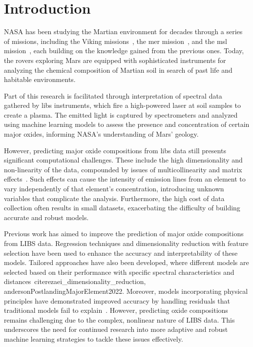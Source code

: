 \section{Introduction}\label{sec:introduction}
NASA has been studying the Martian environment for decades through a series of missions, including the Viking missions~\cite{marsnasagov_vikings}, the \gls{mer} mission~\cite{marsnasagov_observer, marsnasagov_spirit_opportunity}, and the \gls{msl} mission~\cite{marsnasagov_msl}, each building on the knowledge gained from the previous ones.
Today, the rovers exploring Mars are equipped with sophisticated instruments for analyzing the chemical composition of Martian soil in search of past life and habitable environments.

Part of this research is facilitated through interpretation of spectral data gathered by \gls{libs} instruments, which fire a high-powered laser at soil samples to create a plasma.
The emitted light is captured by spectrometers and analyzed using machine learning models to assess the presence and concentration of certain major oxides, informing NASA's understanding of Mars' geology.

However, predicting major oxide compositions from \gls{libs} data still presents significant computational challenges.
These include the high dimensionality and non-linearity of the data, compounded by issues of multicollinearity and matrix effects~\cite{andersonImprovedAccuracyQuantitative2017}.
Such effects can cause the intensity of emission lines from an element to vary independently of that element's concentration, introducing unknown variables that complicate the analysis.
Furthermore, the high cost of data collection often results in small datasets, exacerbating the difficulty of building accurate and robust models.

Previous work has aimed to improve the prediction of major oxide compositions from LIBS data.
Regression techniques and dimensionality reduction with feature selection have been used to enhance the accuracy and interpretability of these models.
Tailored approaches have also been developed, where different models are selected based on their performance with specific spectral characteristics and distances~cite{rezaei_dimensionality_reduction, andersonPostlandingMajorElement2022}.
Moreover, models incorporating physical principles have demonstrated improved accuracy by handling residuals that traditional models fail to explain~\cite{song_DF-K-ELM}.
However, predicting oxide compositions remains challenging due to the complex, nonlinear nature of LIBS data.
This underscores the need for continued research into more adaptive and robust machine learning strategies to tackle these issues effectively.


